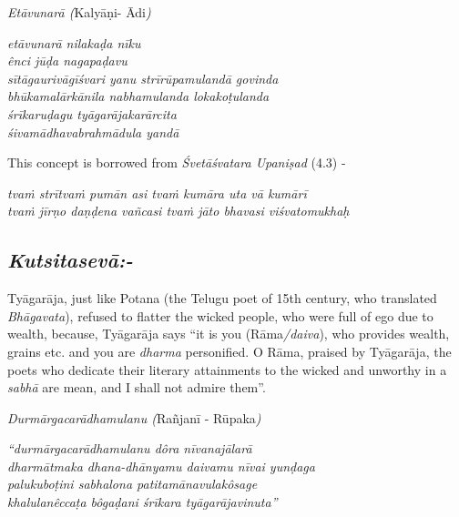 \textit{Etāvunarā (}Kalyāṇi- Ādi\textit{)}

\begin{centerquote}
\textit{etāvunarā nilakaḍa nīku}\\ \textit{ênci jūḍa nagapaḍavu}\\ \textit{sītāgaurivāgīśvari yanu strīrūpamulandā govinda}\\ \textit{bhūkamalārkānila nabhamulanda lokakoṭulanda}\\ \textit{śrīkaruḍagu tyāgarājakarārcita}\\ \textit{śivamādhavabrahmādula yandā}
\end{centerquote}

This concept is borrowed from \textit{Śvetāśvatara Upaniṣad} (4.3) -

\begin{myquote}
\textit{tvaṁ strītvaṁ pumān asi tvaṁ kumāra uta vā kumārī }\\ \textit{tvaṁ jīrṇo daṇḍena vañcasi tvaṁ jāto bhavasi viśvatomukhaḥ} 
\end{myquote}

\vspace{-.4cm}

\subsection*{\textit{Kutsitasevā:-}}

\vspace{-.2cm}

Tyāgarāja, just like Potana (the Telugu poet of 15th century, who translated \textit{Bhāgavata}), refused to flatter the wicked people, who were full of ego due to wealth, because, Tyāgarāja says “it is you (Rāma\textit{/daiva}), who provides wealth, grains etc. and you are \textit{dharma} personified. O Rāma, praised by Tyāgarāja, the poets who dedicate their literary attainments to the wicked and unworthy in a \textit{sabhā} are mean, and I shall not admire them”. 

\textit{Durmārgacarādhamulanu (}Rañjanī - Rūpaka\textit{)}

\begin{longquote}
\textit{“durmārgacarādhamulanu dôra nīvanajālarā}\\ \textit{dharmātmaka dhana-dhānyamu daivamu nīvai yunḍaga}\\ \textit{palukuboṭini sabhalona patitamānavulakôsage}\\ \textit{khalulanêccaṭa bôgaḍani śrīkara tyāgarājavinuta”}
\end{longquote}

